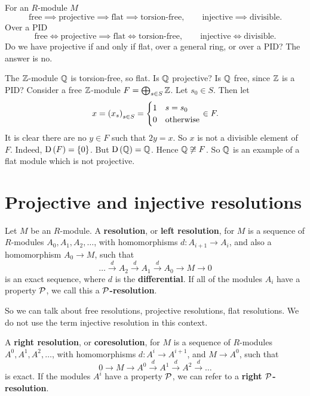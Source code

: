 For an $ R $-module $ M $
$$ \text{free} \implies \text{projective} \implies \text{flat} \implies \text{torsion-free}, \qquad \text{injective} \implies \text{divisible}. $$
Over a PID
$$ \text{free} \iff \text{projective} \implies \text{flat} \iff \text{torsion-free}, \qquad \text{injective} \iff \text{divisible}. $$
Do we have projective if and only if flat, over a general ring, or over a PID? The answer is no.

\begin{example*}
The $ \mathbb{Z} $-module $ \mathbb{Q} $ is torsion-free, so flat. Is $ \mathbb{Q} $ projective? Is $ \mathbb{Q} $ free, since $ \mathbb{Z} $ is a PID? Consider a free $ \mathbb{Z} $-module $ F = \bigoplus_{s \in S} \mathbb{Z} $. Let $ s_0 \in S $. Then let
$$ x = \br{x_s}_{s \in S} =
\begin{cases}
1 & s = s_0 \\
0 & \text{otherwise}
\end{cases}
\in F. $$
It is clear there are no $ y \in F $ such that $ 2y = x $. So $ x $ is not a divisible element of $ F $. Indeed, $ \D\br{F} = \cbr{0} $. But $ \D\br{\QQ} = \QQ $. Hence $ \mathbb{Q} \not\cong F $. So $ \mathbb{Q} $ is an example of a flat module which is not projective.
\end{example*}

\pagebreak

\section{Projective and injective resolutions}

\begin{definition}
Let $ M $ be an $ R $-module. A \textbf{resolution}, or \textbf{left resolution}, for $ M $ is a sequence of $ R $-modules $ A_0, A_1, A_2, \dots $, with homomorphisms $ d : A_{i + 1} \to A_i $, and also a homomorphism $ A_0 \to M $, such that
$$ \dots \xrightarrow{d} A_2 \xrightarrow{d} A_1 \xrightarrow{d} A_0 \to M \to 0 $$
is an exact sequence, where $ d $ is the \textbf{differential}. If all of the modules $ A_i $ have a property $ \mathcal{P} $, we call this a \textbf{$ \mathcal{P} $-resolution}.
\end{definition}

So we can talk about free resolutions, projective resolutions, flat resolutions. We do not use the term injective resolution in this context.

\begin{definition}
A \textbf{right resolution}, or \textbf{coresolution}, for $ M $ is a sequence of $ R $-modules $ A^0, A^1, A^2, \dots $, with homomorphisms $ d : A^i \to A^{i + 1} $, and $ M \to A^0 $, such that
$$ 0 \to M \to A^0 \xrightarrow{d} A^1 \xrightarrow{d} A^2 \xrightarrow{d} \dots $$
is exact. If the modules $ A^i $ have a property $ \mathcal{P} $, we can refer to a \textbf{right $ \mathcal{P} $-resolution}.
\end{definition}

